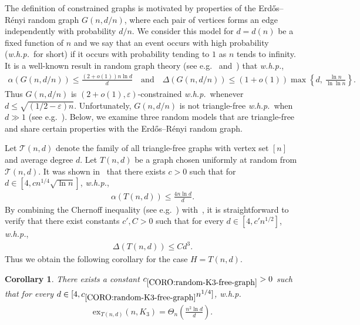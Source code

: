 \documentclass[11pt,a4paper]{article}
\newtheorem{corollary}[definition]{Corollary}
\newcommand{\graph}{H}
\begin{document}
\bigskip

The definition of constrained graphs is motivated by properties of the Erd\H{o}s--R\'{e}nyi random graph $G(n,d/n)$, where each pair of vertices forms an edge independently with probability $d/n$. We consider this model for $d = d(n)$ be a fixed function of $n$ and we say  that an event occurs with high probability (\textit{w.h.p.}~for short) if it occurs with probability tending to $1$ as $n$ tends to infinity.
It is a well-known result in random graph theory (see e.g.~\cite{Fri90} and~{\cite[Theorem~3.4]{FK16book}}) that \textit{w.h.p.}, 
\begin{align*}
    \alpha(G(n,d/n)) 
    \le \frac{(2+o(1)) n \ln d}{d}
    \quad\text{and}\quad
    \Delta(G(n,d/n))
    \le (1+o(1)) \max\left\{d,~\frac{\ln n}{\ln\ln n}\right\}.
\end{align*}
%
Thus $G(n,d/n)$ is $(2+o(1), \varepsilon)$-constrained \textit{w.h.p.}~whenever $d \le \sqrt{(1/2 - \varepsilon) n}$.
Unfortunately, $G(n,d/n)$ is not triangle-free \textit{w.h.p.}~when $d \gg 1$ (see e.g.~{\cite[Theorem~1.12]{FK16book}}).
Below, we examine three random models that are triangle-free and share certain properties with the Erd\H{o}s--R\'{e}nyi random graph.

Let $\mathcal{T}(n,d)$ denote the family of all triangle-free graphs with vertex set $[n]$ and average degree $d$. 
Let $T(n,d)$ be a graph chosen uniformly at random from $\mathcal{T}(n,d)$. 
It was shown in~{\cite[Lemma~3]{OPT01}} that there exists $c > 0$ such that for $d \in [4, cn^{1/4}\sqrt{\ln  n} ]$, \textit{w.h.p.}, 
\begin{align}\label{equ:Tnd-independence-number}
    \alpha(T(n,d)) \le \frac{4 n \ln  d}{d}. 
\end{align}
% 
By combining the Chernoff inequality (see e.g.~{\cite[Theorem~27.6]{FK16book}}) with~{\cite[Lemma~4]{OPT01}}, it is straightforward to verify that there exist constants $c', C> 0$ such that for every $d \in [4,c' n^{1/2}]$, \textit{w.h.p.},
\begin{align}\label{equ:Tnd-max-degree}
    \Delta(T(n,d))
    \le C d^3. 
\end{align}
%
Thus we obtain the following corollary for the case $\graph = T(n,d)$. 

\begin{corollary}\label{CORO:random-K3-free-graph}
    There exists a constant $c_{\ref{CORO:random-K3-free-graph}} > 0$ such that for every $d \in [4, c_{\ref{CORO:random-K3-free-graph}} n^{1/4}]$, \textit{w.h.p.}
    \begin{align*}
        \mathrm{ex}_{T(n,d)}(n, K_{3}) 
        = \Theta_{n}\left(\frac{n^2 \ln  d}{d}\right).
    \end{align*}
\end{corollary}
\end{document}
